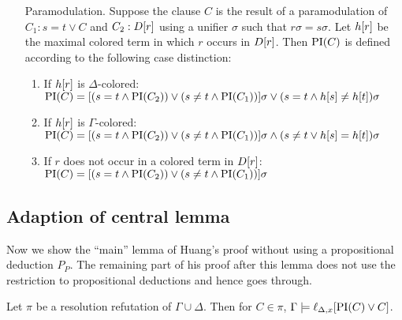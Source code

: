 \documentclass[,%
	paper=a4,%
	DIV14, 
	liststotoc,
	bibtotoc,
	draft=false,%
	numbers=noendperiod
]{scrartcl}
\newcommand{\lif}[1]{\lift{\Delta}{#1}{x}}
\begin{document}
\begin{defi}
\begin{itemize}
    \item[Paramodulation.]
  \label{def:PI_paramod}
      Suppose the clause $C$ is the result of a paramodulation of $C_1: s=t \lor C$ and $C_2: D[r]$ using a       unifier $\sigma$ such that $r\sigma = s\sigma$.
      Let $h[r]$ be the maximal colored term in which $r$ occurs in $D[r]$.
      Then $\operatorname{PI}(C)$ is defined according to the following case distinction:
      \begin{enumerate}

        \item If $h[r]$ is $\Delta$-colored: 
          \label{def:PI_paramod_1}
          \newline
          $\operatorname{PI}(C) = [ ( s=t \land \operatorname{PI}(C_2) ) \lor (s\neq t \land \operatorname{PI}(C_1)) ]\sigma \lor (s=t \land h[s] \neq      h[t])\sigma$
        \item If $h[r]$ is $\Gamma$-colored:
          \label{def:PI_paramod_2}
          \newline
          $\operatorname{PI}(C) = [ ( s=t \land \operatorname{PI}(C_2) ) \lor (s\neq t \land \operatorname{PI}(C_1)) ]\sigma \land (s\neq t \lor h[s] =     h[t])\sigma$
        \item If $r$ does not occur in a colored term in $D[r]$:
          \label{def:PI_paramod_3}
          \newline
          $\operatorname{PI}(C) = [ ( s=t \land \operatorname{PI}(C_2) ) \lor (s\neq t \land \operatorname{PI}(C_1)) ]\sigma$ \qedhere

      \end{enumerate}

  \end{itemize}
\end{defi}

\subsection{Adaption of central lemma}

Now we show the ``main'' lemma of Huang's proof without using a propositional deduction $P_P$.
The remaining part of his proof after this lemma does not use the restriction to propositional deductions and hence goes through.

\begin{lemma}
	Let $\pi$ be a resolution refutation of $\Gamma \cup \Delta$.
	Then for $C \in \pi$,
	$ \Gamma \entails \lif{\PI(C) \lor C} $.
	\label{lemma:gamma_entails_interpolant}
\end{lemma}
\end{document}
